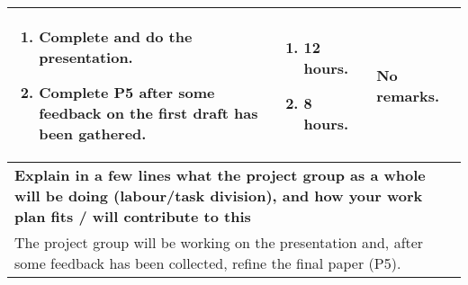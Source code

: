 \documentclass[a4paper]{article}
\begin{document}
\begin{center}
\begin{tabular}{ | p{6cm} | p{6cm} | p{6cm} | p{6cm} | }
    \begin{enumerate}
      \vspace{-6mm}
      \item Complete and do the presentation.
      \item Complete P5 after some feedback on the first draft has been
      gathered.
    \end{enumerate} &
    \begin{enumerate}
      \item 12 hours.
      \item 8 hours.
    \end{enumerate} &
    \multicolumn{2}{|p{12cm}|}{No remarks.} \\
    \hline
    \multicolumn{4}{|p{24cm}|}{\textbf{Explain in a few lines what the project
    group as a whole will be doing (labour/task division), and how your work
    plan fits / will contribute to this}} \\
    \multicolumn{4}{|p{24cm}|}{The project group will be working on the
    presentation and, after some feedback has been collected, refine the final
    paper (P5).} \\
    \hline
  \end{tabular}
  \egroup
\end{center}
\end{document}
